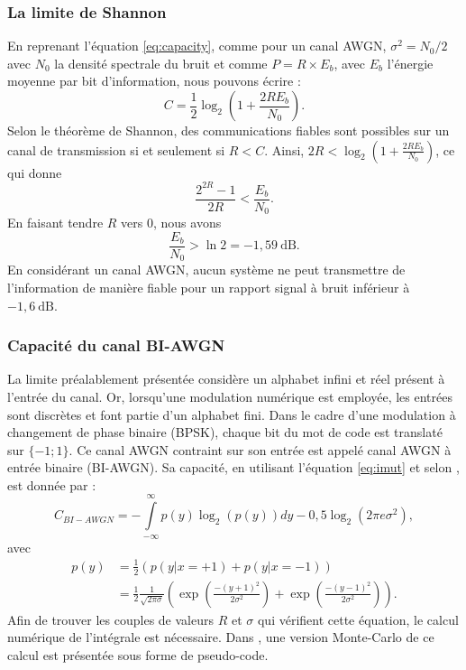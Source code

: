 \subsubsection{La limite de Shannon}
En reprenant l'équation \ref{eq:capacity}, comme pour un canal AWGN, $\sigma^2 = N_0/2$ avec $N_0$ la densité spectrale du bruit et comme 
$P=R\times E_b$, avec $E_b$ l'énergie moyenne par bit d'information, nous pouvons écrire :
\[C=\frac{1}{2}\log_2\left(1+\frac{2RE_b}{N_0}\right).\]
Selon le théorème de Shannon, des communications fiables sont possibles sur un canal de transmission si et seulement si $R < C$. Ainsi,
$2R < \log_2\left(1+\frac{2RE_b}{N_0}\right)$, ce qui donne 
\begin{equation}\label{eq:shlimit}
	\frac{2^{2R}-1}{2R}<\frac{E_b}{N_0}.
\end{equation}
En faisant tendre $R$ vers $0$, nous avons \[\frac{E_b}{N_0}>\ln 2 = -1,59~\text{dB}.\]
En considérant un canal AWGN, aucun système ne peut transmettre de l'information de manière fiable pour un rapport 
signal à bruit inférieur à $-1,6~\text{dB}.$

\subsubsection{Capacité du canal BI-AWGN}
La limite préalablement présentée considère un alphabet infini et réel présent à l'entrée du canal. Or, lorsqu'une 
modulation numérique est employée, les entrées sont discrètes et font partie d'un alphabet fini. Dans le cadre d'une 
modulation à changement de phase binaire (BPSK), chaque bit du mot de code est translaté sur $\{-1;1\}$. Ce canal AWGN 
contraint sur son entrée est appelé canal AWGN à entrée binaire (BI-AWGN). Sa capacité, en utilisant l'équation 
\ref{eq:imut} et selon \cite[Chapitre 8]{ryan}, est donnée par : 
\begin{equation}\label{eq:softlimit}
	C_{BI-AWGN} = - \int\limits_{-\infty}^{\infty} p(y) \log_2\left(p(y)\right)dy - 0,5\log_2\left(2\pi e \sigma^2\right),
\end{equation}
avec 
\begin{align*}
	p(y) & = \frac{1}{2} \left(p(y|x=+1)+p(y|x=-1)\right)                                                    \\
	     & = \frac{1}{2} \frac{1}{\sqrt{2\pi \sigma}} \left( \exp \left(\frac{-(y+1)^2}{2\sigma ^2}\right) + 
	\exp \left(\frac{-(y-1)^2}{2\sigma ^2}\right)\right).
\end{align*}
Afin de trouver les couples de valeurs $R$ et $\sigma$ qui vérifient cette équation, le calcul numérique de l'intégrale 
est nécessaire. Dans \cite{johnson2009iterative}, une version Monte-Carlo de ce calcul est présentée sous forme de pseudo-code.

